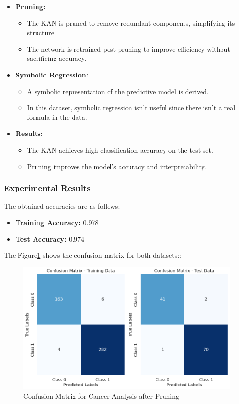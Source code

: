\begin{itemize}
    \item \textbf{Pruning:}
    \begin{itemize}
        \item The KAN is pruned to remove redundant components, simplifying its structure.
        \item The network is retrained post-pruning to improve efficiency without sacrificing accuracy.
    \end{itemize}

    \item \textbf{Symbolic Regression:}
    \begin{itemize}
        \item A symbolic representation of the predictive model is derived.
        \item In this dataset, symbolic regression isn't useful since there isn't a real formula in the data.
    \end{itemize}

    \item \textbf{Results:}
    \begin{itemize}
        \item The KAN achieves high classification accuracy on the test set.
        \item Pruning improves the model's accuracy and interpretability.
    \end{itemize}

\end{itemize}

\subsubsection{Experimental Results}
The obtained accuracies are as follows:
\begin{itemize}
    \item \textbf{Training Accuracy:} 0.978
    \item \textbf{Test Accuracy:} 0.974
\end{itemize}

The Figure\ref{fig:CM} shows the confusion matrix for both datasets::

\begin{figure}[H]
    \centering
    \includegraphics[width=0.65\linewidth]{LATEX//Images/CMcancer-pruning.png}
    \caption{Confusion Matrix for Cancer Analysis after Pruning}
    \label{fig:CM}
\end{figure}